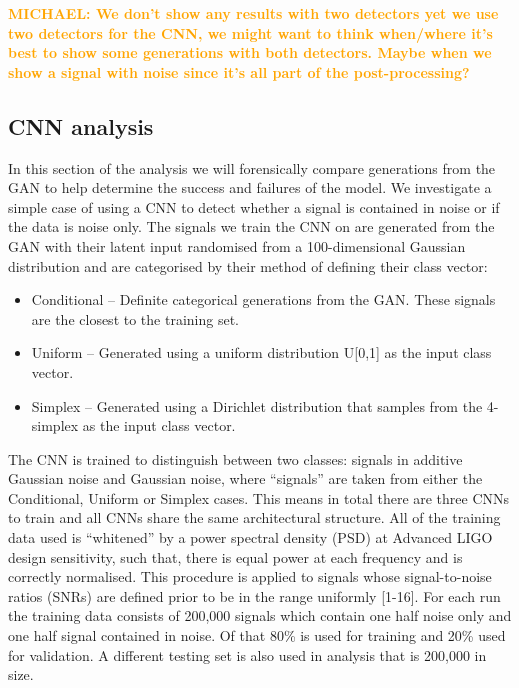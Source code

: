 \documentclass[12pt]{iopart}
\newcommand{\michael}[1]{\textbf{\textcolor{orange}{MICHAEL: #1}}}
\begin{document}

\michael{We don't show any results with two detectors yet we use two detectors for the CNN, we might want to think when/where it's best to show some generations with both detectors. Maybe when we show a signal with noise since it's all part of the post-processing?}

\subsection{CNN analysis}
In this section of the analysis we will forensically compare generations from the GAN to help determine the success and failures of the model. We investigate a simple case of using a CNN to detect whether a signal is contained in noise or if the data is noise only. The signals we train the CNN on are generated from the GAN with their latent input randomised from a 100-dimensional Gaussian distribution and are categorised by their method of defining their class vector: 
\begin{itemize}
	\item Conditional – Definite categorical generations from the GAN. These signals are the closest to the training set.
	\item Uniform – Generated using a uniform distribution U[0,1] as the input class vector.
	\item Simplex – Generated using a Dirichlet distribution that samples from the 4-simplex as the input class vector. 
\end{itemize}
The CNN is trained to distinguish between two classes: signals in additive Gaussian noise and Gaussian noise, where “signals” are taken from either the Conditional, Uniform or Simplex cases. This means in total there are three CNNs to train and all CNNs share the same architectural structure. All of the training data used is “whitened” by a power spectral density (PSD) at Advanced LIGO design sensitivity, such that, there is equal power at each frequency and is correctly normalised. This procedure is applied to signals whose signal-to-noise ratios (SNRs) are defined prior to be in the range uniformly [1-16]. For each run the training data consists of 200,000 signals which contain one half noise only and one half signal contained in noise. Of that 80\% is used for training and 20\% used for validation. A different testing set is also used in analysis that is 200,000 in size. 
\end{document}
